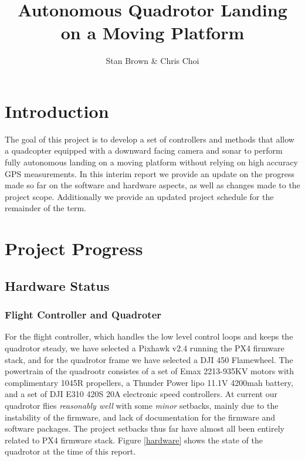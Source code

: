 \documentclass{article}[12pt]
\begin{document}
\vspace{-5cm}
\title{Autonomous Quadrotor Landing on a Moving Platform}
\author{Stan Brown \& Chris Choi}
\date{}
\maketitle

\section*{Introduction}
The goal of this project is to develop a set of controllers and methods that allow a quadcopter equipped with a downward facing camera and sonar to perform fully autonomous landing on a moving platform without relying on high accuracy GPS measurements. In this interim report we provide an update on the progress made so far on the software and hardware aspects, as well as changes made to the project scope. Additionally we provide an updated project schedule for the remainder of the term. 

\section*{Project Progress}
\subsection*{Hardware Status}
\subsubsection*{Flight Controller and Quadroter}
For the flight controller, which handles the low level control loops and keeps the quadrotor steady, we have selected a Pixhawk v2.4 running the PX4 firmware stack, and for the quadrotor frame we have selected a DJI 450 Flamewheel. The powertrain of the quadrootr consistes of a set of Emax 2213-935KV motors with complimentary 1045R propellers, a Thunder Power lipo 11.1V 4200mah battery, and a set of DJI E310 420S 20A electronic speed 
controllers. At current our quadrotor flies \textit{reasonably well} with some \textit{minor} setbacks, mainly due to the instability of the firmware, and lack of documentation for the firmware 
and software packages. The project setbacks thus far have almost all been entirely related to PX4 firmware stack. Figure \ref{hardware} shows the state of the quadrotor at the time of this report. 
\end{document}
